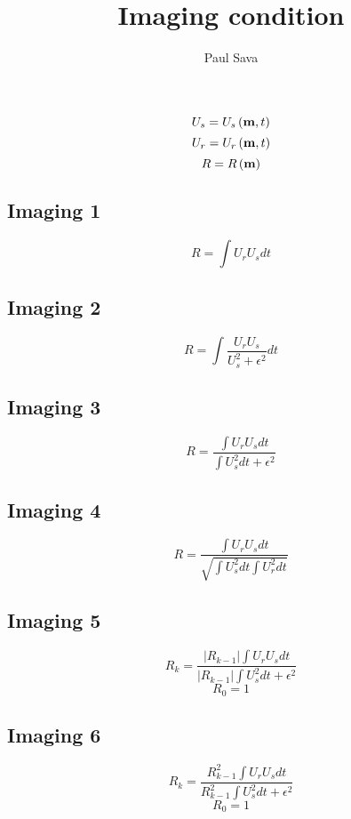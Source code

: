 \title{Imaging condition}
\author{Paul Sava}

\def\mt{\left( {\bf m},t \right)}
\def\mm{\left( {\bf m}   \right)}
\def\Us{U_s}
\def\Ur{U_r}
\def\R {R  }

\[\Us = \Us\mt \]
\[\Ur = \Ur\mt \]
\[\R  = \R \mm \]

\subsection{Imaging 1}
\[ \R = \int \Ur \Us dt \]

\subsection{Imaging 2}
\[ \R = \int \frac{\Ur \Us}{\Us^2 + \epsilon^2} dt \]

\subsection{Imaging 3}
\[ \R = \frac{\int \Ur \Us dt}{\int \Us^2 dt + \epsilon^2} \]

\subsection{Imaging 4}
\[ \R = \frac{\int \Ur \Us dt}
                {\sqrt{\int \Us^2 dt \int \Ur^2 dt}} \]

\subsection{Imaging 5}
\[ \R_k = \frac{ \left| \R_{k-1} \right| \int \Ur \Us dt}
               { \left| \R_{k-1} \right| \int \Us^2   dt + \epsilon^2}
\]
\[ \R_0 = 1 \]

\subsection{Imaging 6}
\[ \R_k = \frac{ \R_{k-1}^2 \int \Ur \Us dt}
               { \R_{k-1}^2 \int \Us^2   dt + \epsilon^2}
\]
\[ \R_0 = 1 \]


